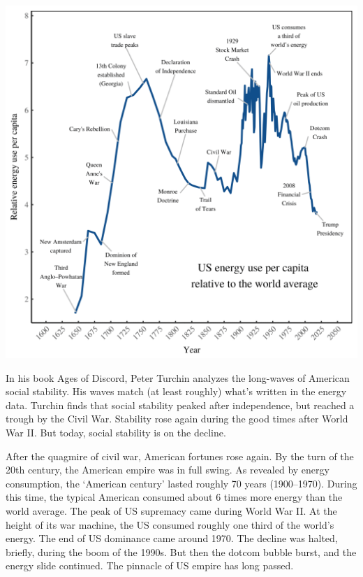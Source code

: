 \documentclass[
]{book}
\begin{document}
\includegraphics{fig/us_energy_pc.png}

In his book Ages of Discord, Peter Turchin analyzes the long-waves of American social stability. His waves match (at least roughly) what's written in the energy data. Turchin finds that social stability peaked after independence, but reached a trough by the Civil War. Stability rose again during the good times after World War II. But today, social stability is on the decline.

After the quagmire of civil war, American fortunes rose again. By the turn of the 20th century, the American empire was in full swing. As revealed by energy consumption, the `American century' lasted roughly 70 years (1900--1970). During this time, the typical American consumed about 6 times more energy than the world average. The peak of US supremacy came during World War II. At the height of its war machine, the US consumed roughly one third of the world's energy.
The end of US dominance came around 1970.
The decline was halted, briefly, during the boom of the 1990s.
But then the dotcom bubble burst, and the energy slide continued.
The pinnacle of US empire has long passed.
\end{document}
